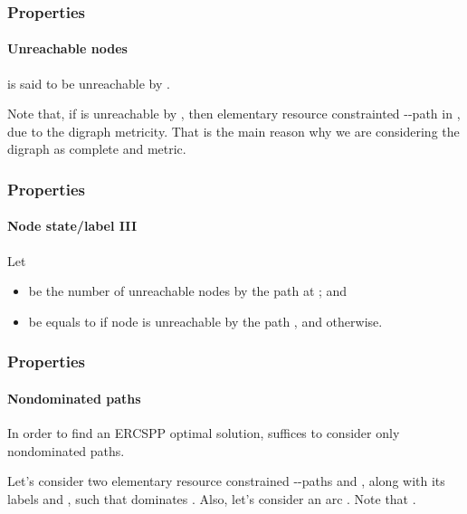 \begin{frame}
  \frametitle{Properties}
  \framesubtitle{Unreachable nodes}
  \begin{definition}
   is said to be unreachable by  .
  \end{definition}
  Note that, if  is unreachable by , then \blue{$\nexists$} elementary resource constrainted --path in , due to the digraph metricity.
  That is the main reason why we are considering the digraph as complete and metric.
\end{frame}

\begin{frame}
  \frametitle{Properties}
  \framesubtitle{Node state/label III}
  Let
  \begin{itemize}
    \item {} be the number of unreachable nodes by the path  at ; and 
    \item {} be equals to  if node  is unreachable by the path , and  otherwise.
  \end{itemize}
\end{frame}

\begin{frame}
  \frametitle{Properties}
  \framesubtitle{Nondominated paths}
  \begin{claim}
    In order to find an ERCSPP optimal solution, suffices to consider only nondominated paths.
  \end{claim}
  \begin{claimproof}
    Let's consider two elementary resource constrained --paths  and , along with its labels  and , such that  dominates .
    Also, let's consider an arc  .
    Note that  .
  \end{claimproof}
\end{frame}
